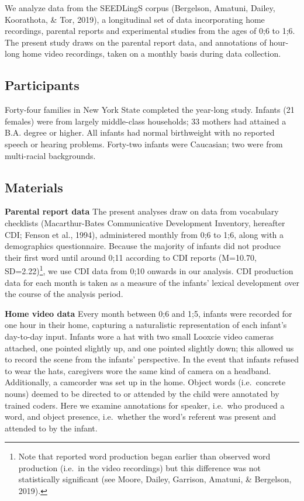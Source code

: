 \documentclass[
  english,
  man,floatsintext]{apa6}
\begin{document}
We analyze data from the SEEDLingS corpus (Bergelson, Amatuni, Dailey, Koorathota, \& Tor, 2019), a longitudinal set of data incorporating home recordings, parental reports and experimental studies from the ages of 0;6 to 1;6. The present study draws on the parental report data, and annotations of hour-long home video recordings, taken on a monthly basis during data collection.

\hypertarget{participants}{%
\subsection{Participants}\label{participants}}

Forty-four families in New York State completed the year-long study. Infants (21 females) were from largely middle-class households; 33 mothers had attained a B.A. degree or higher. All infants had normal birthweight with no reported speech or hearing problems. Forty-two infants were Caucasian; two were from multi-racial backgrounds.

\hypertarget{materials}{%
\subsection{Materials}\label{materials}}

\textbf{Parental report data} The present analyses draw on data from vocabulary checklists (Macarthur-Bates Communicative Development Inventory, hereafter CDI; Fenson et al., 1994), administered monthly from 0;6 to 1;6, along with a demographics questionnaire. Because the majority of infants did not produce their first word until around 0;11 according to CDI reports (M=10.70, SD=2.22)\footnote{Note that reported word production began earlier than observed word production (i.e.~in the video recordings) but this difference was not statistically significant (see Moore, Dailey, Garrison, Amatuni, \& Bergelson, 2019).}, we use CDI data from 0;10 onwards in our analysis. CDI production data for each month is taken as a measure of the infants' lexical development over the course of the analysis period.

\textbf{Home video data} Every month between 0;6 and 1;5, infants were recorded for one hour in their home, capturing a naturalistic representation of each infant's day-to-day input. Infants wore a hat with two small Looxcie video cameras attached, one pointed slightly up, and one pointed slightly down; this allowed us to record the scene from the infants' perspective. In the event that infants refused to wear the hats, caregivers wore the same kind of camera on a headband. Additionally, a camcorder was set up in the home. Object words (i.e.~concrete nouns) deemed to be directed to or attended by the child were annotated by trained coders. Here we examine annotations for speaker, i.e.~who produced a word, and object presence, i.e.~whether the word's referent was present and attended to by the infant.
\end{document}
